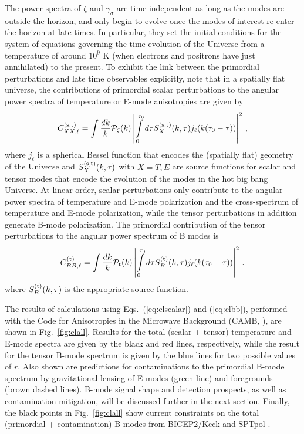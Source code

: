 The power spectra of $\zeta$ and $\gamma_\sigma$ are time-independent as long as the modes are outside the horizon, and only begin to evolve once the modes of interest re-enter the horizon at late times. In particular, they set the initial conditions for the system of equations governing the time evolution of the Universe from a temperature of around $10^9$ K (when electrons and positrons have just annihilated) to the present. To exhibit the link between the primordial perturbations and late time observables explicitly, note that in a spatially flat universe, the contributions of primordial scalar perturbations to the angular power spectra of temperature or E-mode anisotropies are given by
\begin{equation}
C^{({\rm s,t})}_{XX,\ell}=\int \frac{dk}{k}\mathcal{P}_\zeta(k)\left|\int\limits_0^{\tau_0} d\tau S_X^{({\rm s,t})}(k,\tau)j_\ell(k(\tau_0-\tau))\right|^2\,,
\label{eq:clscalar}
\end{equation}
where $j_\ell$ is a spherical Bessel function that encodes the (spatially flat) geometry of the Universe and $S_X^{({\rm s,t})}(k,\tau)$ with $X=T,E$ are source functions for scalar and tensor modes that encode the evolution of the modes in the hot big bang Universe.
At linear order, scalar perturbations only contribute to the angular power spectra of temperature and E-mode polarization and the cross-spectrum of temperature and E-mode polarization, while the tensor perturbations in addition generate B-mode polarization. The primordial contribution of the tensor perturbations to the angular power spectrum of B modes is 
\begin{equation}
C^{({\rm t})}_{BB,\ell}=\int \frac{dk}{k}\mathcal{P}_{\rm t}(k)\left|\int\limits_0^{\tau_0} d\tau S_B^{({\rm t})}(k,\tau)j_\ell(k(\tau_0-\tau))\right|^2\,.
\label{eq:clbb}
\end{equation}
where $S_B^{({\rm t})}(k,\tau)$ is the appropriate source function. 

The results of calculations using Eqs.~(\ref{eq:clscalar}) and (\ref{eq:clbb}), performed with the Code for Anisotropies in the Microwave Background (CAMB, \cite{Lewis:1999bs}), are shown in Fig.~\ref{fig:clall}. Results for the total (scalar + tensor) temperature and E-mode spectra are given by the black and red lines, respectively, while the result for the tensor B-mode spectrum is given by the blue lines for two possible values of $r$. Also shown are predictions for contaminations to the primordial B-mode spectrum by gravitational lensing of E modes (green line) and foregrounds (brown dashed lines). B-mode signal shape and detection prospects, as well as contamination mitigation, will be discussed further in the next section.  Finally, the black points in Fig.~\ref{fig:clall} show current constraints on the total (primordial + contamination) B modes from BICEP2/Keck \cite{Ade:2015fwj} and SPTpol \cite{Keisler:2015hfa}.

